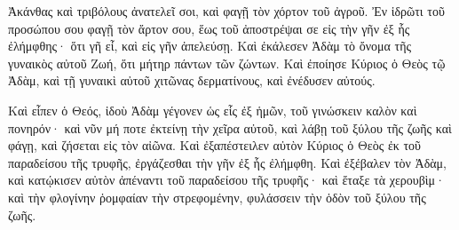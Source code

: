 {Ἀκάνθας καὶ τριβόλους ἀνατελεῖ σοι, καὶ φαγῇ τὸν χόρτον τοῦ ἀγροῦ.
Ἐν ἱδρῶτι τοῦ προσώπου σου φαγῇ τὸν ἄρτον σου, ἕως τοῦ ἀποστρέψαι σε εἰς τὴν γῆν ἐξ ἧς ἐλήμφθης· ὅτι γῆ εἶ, καὶ εἰς γῆν ἀπελεύσῃ.
Καὶ ἐκάλεσεν Ἀδὰμ τὸ ὄνομα τῆς γυναικὸς αὐτοῦ Ζωή, ὅτι μήτηρ πάντων τῶν ζώντων.
Καὶ ἐποίησε Κύριος ὁ Θεὸς τῷ Ἀδὰμ, καὶ τῇ γυναικὶ αὐτοῦ χιτῶνας δερματίνους, καὶ ἐνέδυσεν αὐτούς.
\par }{\PP {}Καὶ εἶπεν ὁ Θεός, ἰδοὺ Ἀδὰμ γέγονεν ὡς εἷς ἐξ ἡμῶν, τοῦ γινώσκειν καλὸν καὶ πονηρόν· καὶ νῦν μή ποτε ἐκτείνῃ τὴν χεῖρα αὐτοῦ, καὶ λάβῃ τοῦ ξύλου τῆς ζωῆς καὶ φάγῃ, καὶ ζήσεται εἰς τὸν αἰῶνα.
Καὶ ἐξαπέστειλεν αὐτὸν Κύριος ὁ Θεὸς ἐκ τοῦ παραδείσου τῆς τρυφῆς, ἐργάζεσθαι τὴν γῆν ἐξ ἧς ἐλήμφθη.
Καὶ ἐξέβαλεν τὸν Ἀδὰμ, καὶ κατῴκισεν αὐτὸν ἀπέναντι τοῦ παραδείσου τῆς τρυφῆς· καὶ ἔταξε τὰ χερουβὶμ· καὶ τὴν φλογίνην ῥομφαίαν τὴν στρεφομένην, φυλάσσειν τὴν ὁδὸν τοῦ ξύλου τῆς ζωῆς.

}
